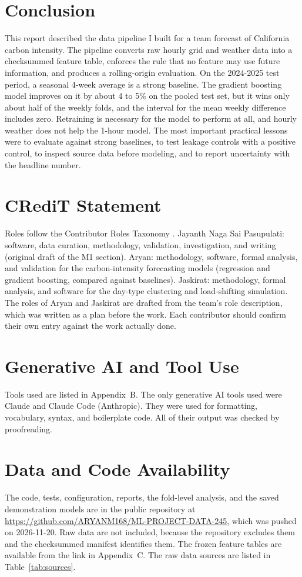 \documentclass[10pt,journal,compsoc]{IEEEtran}
\begin{document}
\section{Conclusion}
This report described the data pipeline I built for a team forecast of California carbon intensity. The pipeline converts raw hourly grid and weather data into a checksummed feature table, enforces the rule that no feature may use future information, and produces a rolling-origin evaluation. On the 2024-2025 test period, a seasonal 4-week average is a strong baseline. The gradient boosting model improves on it by about 4 to 5\% on the pooled test set, but it wins only about half of the weekly folds, and the interval for the mean weekly difference includes zero. Retraining is necessary for the model to perform at all, and hourly weather does not help the 1-hour model. The most important practical lessons were to evaluate against strong baselines, to test leakage controls with a positive control, to inspect source data before modeling, and to report uncertainty with the headline number.

\section*{CRediT Statement}
Roles follow the Contributor Roles Taxonomy \cite{credit}. Jayanth Naga Sai Pasupulati: software, data curation, methodology, validation, investigation, and writing (original draft of the M1 section). Aryan: methodology, software, formal analysis, and validation for the carbon-intensity forecasting models (regression and gradient boosting, compared against baselines). Jaskirat: methodology, formal analysis, and software for the day-type clustering and load-shifting simulation. The roles of Aryan and Jaskirat are drafted from the team's role description, which was written as a plan before the work. Each contributor should confirm their own entry against the work actually done.

\section*{Generative AI and Tool Use}
Tools used are listed in Appendix~B. The only generative AI tools used were Claude and Claude Code (Anthropic). They were used for formatting, vocabulary, syntax, and boilerplate code. All of their output was checked by proofreading.

\section*{Data and Code Availability}
The code, tests, configuration, reports, the fold-level analysis, and the saved demonstration models are in the public repository at \url{https://github.com/ARYANM168/ML-PROJECT-DATA-245}, which was pushed on 2026-11-20. Raw data are not included, because the repository excludes them and the checksummed manifest identifies them. The frozen feature tables are available from the link in Appendix~C. The raw data sources are listed in Table~\ref{tab:sources}.
\end{document}
